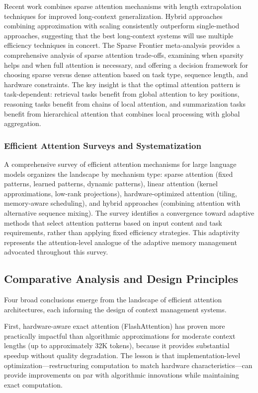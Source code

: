 \documentclass[11pt,letterpaper]{article}
\begin{document}
Recent work combines sparse attention mechanisms with length extrapolation techniques for improved long-context generalization. Hybrid approaches combining approximation with scaling consistently outperform single-method approaches, suggesting that the best long-context systems will use multiple efficiency techniques in concert. The Sparse Frontier meta-analysis provides a comprehensive analysis of sparse attention trade-offs, examining when sparsity helps and when full attention is necessary, and offering a decision framework for choosing sparse versus dense attention based on task type, sequence length, and hardware constraints. The key insight is that the optimal attention pattern is task-dependent: retrieval tasks benefit from global attention to key positions, reasoning tasks benefit from chains of local attention, and summarization tasks benefit from hierarchical attention that combines local processing with global aggregation.

\subsubsection{Efficient Attention Surveys and Systematization}

A comprehensive survey of efficient attention mechanisms for large language models organizes the landscape by mechanism type: sparse attention (fixed patterns, learned patterns, dynamic patterns), linear attention (kernel approximations, low-rank projections), hardware-optimized attention (tiling, memory-aware scheduling), and hybrid approaches (combining attention with alternative sequence mixing). The survey identifies a convergence toward adaptive methods that select attention patterns based on input content and task requirements, rather than applying fixed efficiency strategies. This adaptivity represents the attention-level analogue of the adaptive memory management advocated throughout this survey.

\subsection{Comparative Analysis and Design Principles}

Four broad conclusions emerge from the landscape of efficient attention architectures, each informing the design of context management systems.

First, hardware-aware exact attention (FlashAttention) has proven more practically impactful than algorithmic approximations for moderate context lengths (up to approximately 32K tokens), because it provides substantial speedup without quality degradation. The lesson is that implementation-level optimization---restructuring computation to match hardware characteristics---can provide improvements on par with algorithmic innovations while maintaining exact computation.
\end{document}
